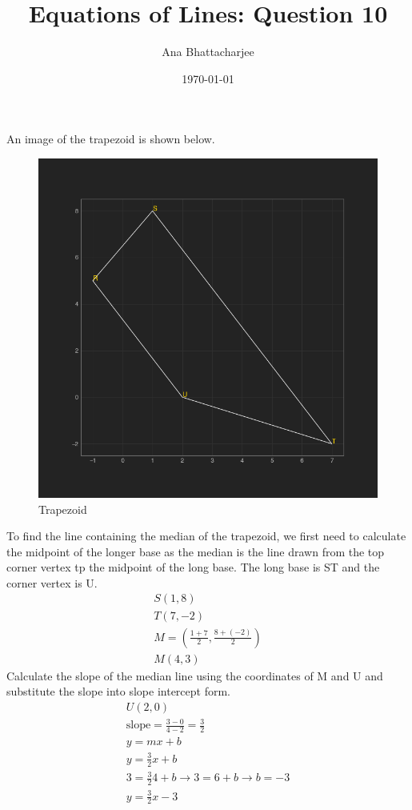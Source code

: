 \documentclass{article}
\begin{document}
\title{Equations of Lines: Question 10}
\author{Ana Bhattacharjee}
\date{\today}
\maketitle{}

\begin{center}
An image of the trapezoid is shown below.
\begin{figure}
  \includegraphics[width=1.1\columnwidth]{../line_eq_q10}
  \caption{Trapezoid}
\end{figure}
\par
To find the line containing the median of the trapezoid, we first need to calculate the midpoint of the longer base as the median is the line drawn from the top corner vertex tp the midpoint of the long base. The long base is ST and the corner vertex is U.
\begin{align}
S (1, 8) \\
T (7, -2) \\
M = (\frac{1 + 7}{2}, \frac{8 + (-2)}{2}) \\
M (4, 3)
\end{align}
Calculate the slope of the median line using the coordinates of M and U and substitute the slope into slope intercept form.
\begin{align}
U (2, 0) \\
\text{slope} = \frac{3 - 0 }{4 - 2} = \frac{3}{2} \\
y = mx + b \\
y = \frac{3}{2}x + b \\
3 = \frac{3}{2}4 + b \rightarrow 3 = 6 + b \rightarrow b = -3  \\
y = \frac{3}{2}x - 3
\end{align}
\end{center}
\end{document}
